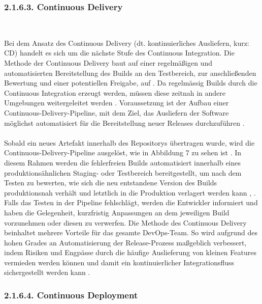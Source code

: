 \subsubsection{2.1.6.3. Continuous Delivery} $~$

Bei dem Ansatz des Continuous Delivery (dt. kontinuierliches Ausliefern, kurz: CD) handelt es sich um die nächste Stufe des Continuous Integration. Die Methode der Continuous Delivery baut auf einer regelmäßigen und automatisierten Bereitstellung des Builds an den Testbereich, zur anschließenden Bewertung und einer potentiellen Freigabe, auf \cite[S. 16 - 18]{sharma_devops_2017}. Da regelmässig Builds durch die Continuous Integration erzeugt werden, müssen diese zeitnah in andere Umgebungen weitergeleitet werden \cite[S. 16 - 18]{sharma_devops_2017}. Voraussetzung ist der Aufbau einer Continuous-Delivery-Pipeline, mit dem Ziel, das Ausliefern der Software möglichst automatisiert für die Bereitstellung neuer Releases durchzuführen \cite[S. 10]{wolff_continuous_2016}. \\\\ Sobald ein neues Artefakt innerhalb des Repositorys übertragen wurde, wird die Continuous-Delivery-Pipeline ausgelöst, wie in Abbildung 7 zu sehen ist \cite[S. 14]{verona_practical_2016}. In diesem Rahmen werden die fehlerfreien Builds automatisiert innerhalb eines produktionsähnlichen Staging- oder Testbereich bereitgestellt, um nach dem Testen zu bewerten, wie sich die neu entstandene Version des Builds produktionsnah verhält und letztlich in die Produktion verlagert werden kann \cite[S. 16]{sharma_devops_2017}, \cite{thedev_eight_2019}. Falls das Testen in der Pipeline fehlschlägt, werden die Entwickler informiert und haben die Gelegenheit, kurzfristig Anpassungen an dem jeweiligen Build vorzunehmen oder diesen zu verwerfen. Die Methode des Continuous Delivery beinhaltet mehrere Vorteile für das gesamte DevOps-Team. So wird aufgrund des hohen Grades an Automatisierung der Release-Prozess maßgeblich verbessert, indem Risiken und Engpässe durch die häufige Auslieferung von kleinen Features vermieden werden können und damit ein kontinuierlicher Integrationsfluss sichergestellt werden kann \cite[S. 18]{wolff_continuous_2016}.

\subsubsection{2.1.6.4. Continuous Deployment} $~$

